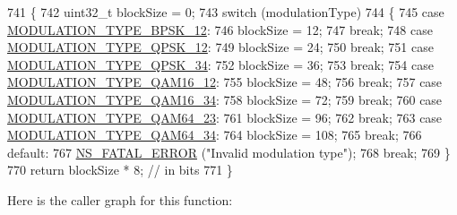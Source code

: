 \begin{DoxyCode}
741 \{
742   uint32\_t blockSize = 0;
743   \textcolor{keywordflow}{switch} (modulationType)
744     \{
745     \textcolor{keywordflow}{case} \hyperlink{classns3_1_1WimaxPhy_a044c5d8a48ca992c39c2a946f6e755faaef0b78541d9b66d4e85780131e665028}{MODULATION\_TYPE\_BPSK\_12}:
746       blockSize = 12;
747       \textcolor{keywordflow}{break};
748     \textcolor{keywordflow}{case} \hyperlink{classns3_1_1WimaxPhy_a044c5d8a48ca992c39c2a946f6e755faa21f9f78031cd1105c0ff97c9df57de1d}{MODULATION\_TYPE\_QPSK\_12}:
749       blockSize = 24;
750       \textcolor{keywordflow}{break};
751     \textcolor{keywordflow}{case} \hyperlink{classns3_1_1WimaxPhy_a044c5d8a48ca992c39c2a946f6e755faaed15df1f1feb034c0f69dc5e44d05834}{MODULATION\_TYPE\_QPSK\_34}:
752       blockSize = 36;
753       \textcolor{keywordflow}{break};
754     \textcolor{keywordflow}{case} \hyperlink{classns3_1_1WimaxPhy_a044c5d8a48ca992c39c2a946f6e755faa3b72d83f9fc0c4f964a939a0aa2df5af}{MODULATION\_TYPE\_QAM16\_12}:
755       blockSize = 48;
756       \textcolor{keywordflow}{break};
757     \textcolor{keywordflow}{case} \hyperlink{classns3_1_1WimaxPhy_a044c5d8a48ca992c39c2a946f6e755faa821f09b9921774eb6875b7ec4686ab58}{MODULATION\_TYPE\_QAM16\_34}:
758       blockSize = 72;
759       \textcolor{keywordflow}{break};
760     \textcolor{keywordflow}{case} \hyperlink{classns3_1_1WimaxPhy_a044c5d8a48ca992c39c2a946f6e755faadc970aa3e5c6c6774cc30daf2c9e176f}{MODULATION\_TYPE\_QAM64\_23}:
761       blockSize = 96;
762       \textcolor{keywordflow}{break};
763     \textcolor{keywordflow}{case} \hyperlink{classns3_1_1WimaxPhy_a044c5d8a48ca992c39c2a946f6e755faa6d659f22bcedc066aa831271b75734a9}{MODULATION\_TYPE\_QAM64\_34}:
764       blockSize = 108;
765       \textcolor{keywordflow}{break};
766     \textcolor{keywordflow}{default}:
767       \hyperlink{group__fatal_ga5131d5e3f75d7d4cbfd706ac456fdc85}{NS\_FATAL\_ERROR} (\textcolor{stringliteral}{"Invalid modulation type"});
768       \textcolor{keywordflow}{break};
769     \}
770   \textcolor{keywordflow}{return} blockSize * 8; \textcolor{comment}{// in bits}
771 \}
\end{DoxyCode}


Here is the caller graph for this function\+:


